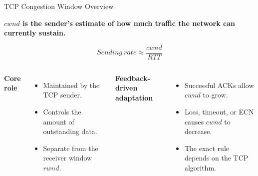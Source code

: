 \begin{frame}{TCP Congestion Window Overview}

\begin{center}
\textbf{$cwnd$ is the sender's estimate of how much traffic the network can currently sustain.}
\end{center}

\[
\boxed{Sending\ rate \approx \frac{cwnd}{RTT}}
\]

\begin{columns}[T,onlytextwidth]
\textbf{Core role}
\begin{itemize}
    \item Maintained by the TCP sender.
    \item Controls the amount of outstanding data.
    \item Separate from the receiver window $rwnd$.
\end{itemize}

\textbf{Feedback-driven adaptation}
\begin{itemize}
    \item Successful ACKs allow $cwnd$ to grow.
    \item Loss, timeout, or ECN causes $cwnd$ to decrease.
    \item The exact rule depends on the TCP algorithm.
\end{itemize}
\end{columns}

\vspace{0cm}
\begin{center}
\end{center}

\end{frame}
